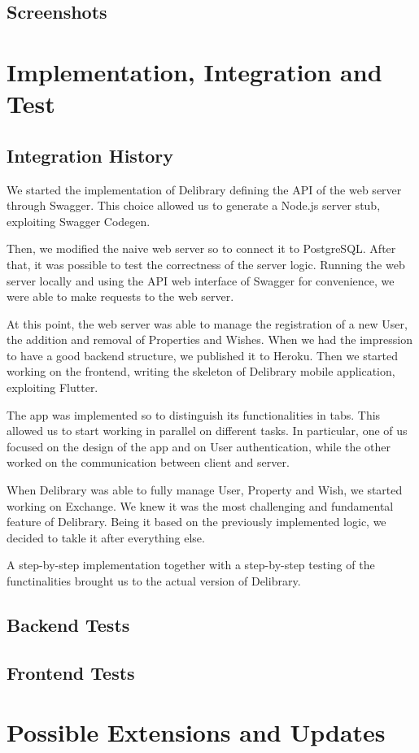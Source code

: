 \section{Screenshots}



\chapter{Implementation, Integration and Test}

\section{Integration History}
We started the implementation of Delibrary defining the API of the web server through Swagger.
This choice allowed us to generate a Node.js server stub, exploiting Swagger Codegen.

Then, we modified the naive web server so to connect it to PostgreSQL.
After that, it was possible to test the correctness of the server logic.
Running the web server locally and using the API web interface of Swagger for convenience, we were able to make requests to the web server.

At this point, the web server was able to manage the registration of a new User, the addition and removal of Properties and Wishes.
When we had the impression to have a good backend structure, we published it to Heroku.
Then we started working on the frontend, writing the skeleton of Delibrary mobile application, exploiting Flutter.

The app was implemented so to distinguish its functionalities in tabs. This allowed us to start working in parallel on different tasks.
In particular, one of us focused on the design of the app and on User authentication, while the other worked on the communication between client and server.

When Delibrary was able to fully manage User, Property and Wish, we started working on Exchange.
We knew it was the most challenging and fundamental feature of Delibrary.
Being it based on the previously implemented logic, we decided to takle it after everything else.

A step-by-step implementation together with a step-by-step testing of the functinalities brought us to the actual version of Delibrary.

\section{Backend Tests}

\section{Frontend Tests}



\chapter{Possible Extensions and Updates}



